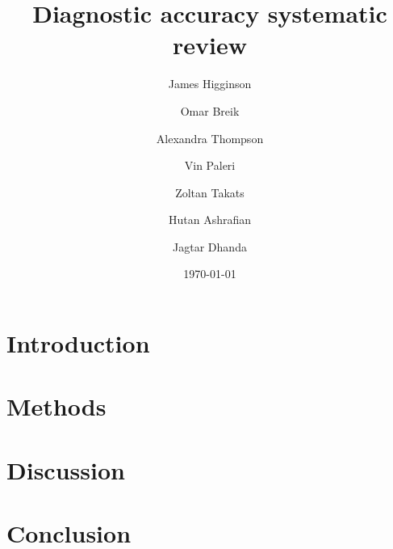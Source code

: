 

\title{Diagnostic accuracy systematic review}
\date{\today}
\author{
James Higginson \and
Omar Breik \and 
Alexandra Thompson \and
Vin Paleri \and
Zoltan Takats \and
Hutan Ashrafian \and
Jagtar Dhanda
}

  



\maketitle




\section{Introduction}



\section{Methods}


\section{Discussion}


\section{Conclusion}





\printbibliography






